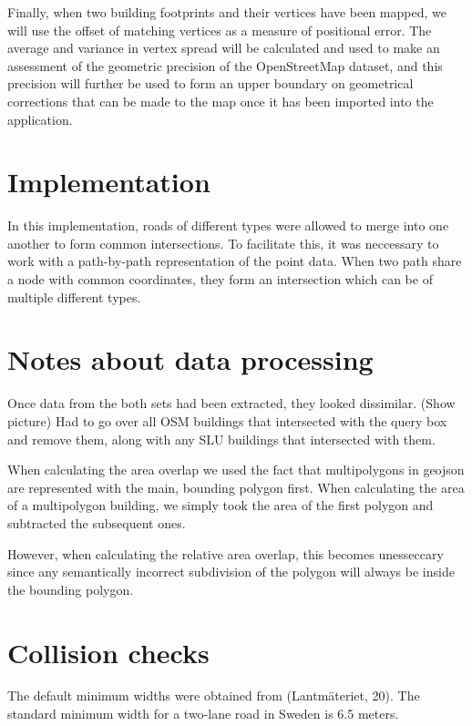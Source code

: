 \documentclass[a4paper]{article}
\begin{document}
Finally, when two building footprints and their vertices have been mapped, we will use the offset of matching vertices as a measure of positional error. The average and variance in vertex spread will be calculated and used to make an assessment of the geometric precision of the OpenStreetMap dataset, and this precision will further be used to form an upper boundary on geometrical corrections that can be made to the map once it has been imported into the application.

\section{Implementation}

In this implementation, roads of different types were allowed to merge into one another to form common intersections. To facilitate this, it was neccessary to work with a path-by-path representation of the point data. When two path share a node with common coordinates, they form an intersection which can be of multiple different types.


\section{Notes about data processing}

Once data from the both sets had been extracted, they looked dissimilar. (Show picture) Had to go over all OSM buildings that intersected with the query box and remove them, along with any SLU buildings that intersected with them.

When calculating the area overlap we used the fact that multipolygons in geojson are represented with the main, bounding polygon first. When calculating the area of a multipolygon building, we simply took the area of the first polygon and subtracted the subsequent ones.

However, when calculating the relative area overlap, this becomes unesseccary since any semantically incorrect subdivision of the polygon will always be inside the bounding polygon.

\section{Collision checks}

The default minimum widths were obtained from (Lantmäteriet, 20). The standard minimum width for a two-lane road in Sweden is 6.5 meters.
\end{document}
